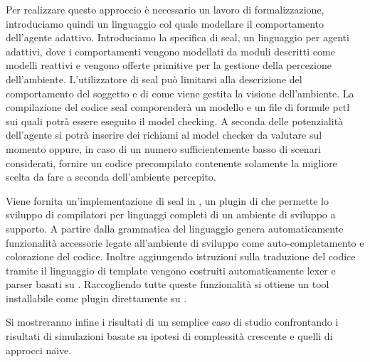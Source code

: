 Per realizzare questo approccio è necessario un lavoro di formalizzazione, introduciamo quindi un linguaggio col quale modellare il comportamento dell'agente adattivo. Introduciamo la specifica di \ac{seal}, un linguaggio per agenti adattivi, dove i comportamenti vengono modellati da moduli descritti come modelli reattivi e vengono offerte primitive per la gestione della percezione dell'ambiente. L'utilizzatore di \ac{seal} può limitarsi alla descrizione del comportamento del soggetto e di come viene gestita la visione dell'ambiente. La compilazione del codice \ac{seal} comporenderà un modello \prism{} e un file di formule \ac{pctl} sui quali potrà essere eseguito il model checking. A seconda delle potenzialità dell'agente si potrà inserire dei richiami al model checker da valutare sul momento oppure, in caso di un numero sufficientemente basso di scenari considerati, fornire un codice precompilato contenente solamente la migliore scelta da fare a seconda dell'ambiente percepito.

Viene fornita un'implementazione di \ac{seal} in \xtext{} \cite{xtext}, un plugin di \eclipse{} che permette lo sviluppo di compilatori per linguaggi completi di un ambiente di sviluppo a supporto. A partire dalla grammatica del linguaggio \xtext{} genera automaticamente funzionalità accessorie legate all'ambiente di sviluppo come auto-completamento e colorazione del codice. Inoltre aggiungendo istruzioni sulla traduzione del codice tramite il linguaggio di template \xtend{} \cite{xtend}
vengono costruiti automaticamente lexer e parser basati su \antlr{} \cite{Parr95antlr:a}.
Raccogliendo tutte queste funzionalità si ottiene un tool installabile come plugin direttamente su \eclipse{}.

Si mostreranno infine i risultati di un semplice caso di studio confrontando i risultati di simulazioni basate su ipotesi di complessità crescente e quelli di approcci na\"{\i}ve.